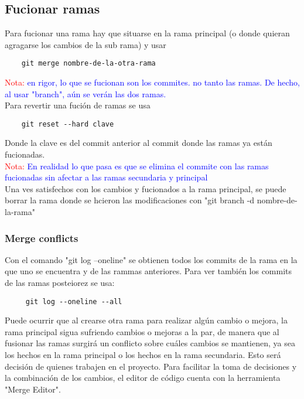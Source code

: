 \documentclass[10pt,oneside]{article}
\begin{document}
\begin{multicols}{2}
\subsection{Fucionar ramas} Para fucionar una rama hay que situarse en la rama principal (o donde quieran agragarse los cambios de la sub rama) y usar \begin{verbatim}
    git merge nombre-de-la-otra-rama
\end{verbatim}
\textcolor{red}{Nota:} \textcolor{blue}{en rigor, lo que se fucionan son los commites. no tanto las ramas. De hecho, al usar "branch", aún se verán las dos ramas.} \\\newline Para revertir una fución de ramas se usa 
\begin{verbatim}
    git reset --hard clave
\end{verbatim}
Donde la clave es del commit anterior al commit donde las ramas ya están fucionadas. \\ \newline \textcolor{red}{Nota:} \textcolor{blue}{En realidad lo que pasa es que se elimina el commite con las ramas fucionadas sin afectar a las ramas secundaria y principal} \\ \newline Una ves satisfechos con los cambios y fucionados a la rama principal, se puede borrar la rama donde se hcieron las modificaciones con "git branch -d nombre-de-la-rama"
\subsubsection{Merge conflicts}
 Con el comando "git log --oneline" se obtienen todos los commits de la rama en la que uno se encuentra y de las rammas anteriores. Para ver también los commits de las ramas posteiorez se usa:\begin{verbatim}
     git log --oneline --all 
 \end{verbatim}
 Puede ocurrir que al crearse otra rama para realizar algún cambio o mejora, la rama principal sigua sufriendo cambios o mejoras a la par, de manera que al fusionar las ramas surgirá un conflicto sobre cuáles cambios se mantienen, ya sea los hechos en la rama principal o los hechos en la rama secundaria. Esto será decisión de quienes trabajen en el proyecto. Para facilitar la toma de decisiones y la combinación de los cambios, el editor de código cuenta con la herramienta "Merge Editor".  

\end{multicols}
\end{document}
